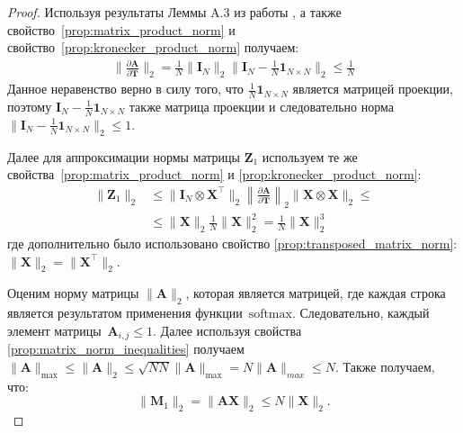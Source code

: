 \begin{proof}

Используя результаты Леммы A.3 из работы \cite{noci2022signalpropagationtransformerstheoretical}, а также свойство~\ref{prop:matrix_product_norm} и свойство~\ref{prop:kronecker_product_norm} получаем:
\begin{align}
    \| \frac{\partial\mathbf{A}}{\partial\mathbf{T}}\|_2 = \frac{1}{N} \| \mathbf{I}_{N}\|_2 \| \mathbf{I}_{N} - \frac{1}{N}\mathbf{1}_{N \times N}\|_2 \leq \frac{1}{N}
\end{align}
Данное неравенство верно в силу того, что $\frac{1}{N}\mathbf{1}_{N \times N}$ является матрицей проекции, поэтому $\mathbf{I}_{N} - \frac{1}{N}\mathbf{1}_{N \times N}$ также матрица проекции и следовательно норма $\| \mathbf{I}_{N} - \frac{1}{N}\mathbf{1}_{N \times N}\|_2 \leq 1$.

Далее для аппроксимации нормы матрицы $\mathbf{Z}_1$ используем те же свойства~\ref{prop:matrix_product_norm} и \ref{prop:kronecker_product_norm}:
\begin{align}\label{chapter-2:theorem:proof_Znorm}
    \|\mathbf{Z}_1\|_2 &\leq \| \mathbf{I}_{N} \otimes \mathbf{X}^{\top}\|_2 \left\| \frac{\partial \mathbf{A}}{\partial \mathbf{T}}\right\|_2 \| \mathbf{X} \otimes \mathbf{X}\|_2 \leq\\
    & \leq \| \mathbf{X}\|_2 \frac{1}{N} \|\mathbf{X}\|^2_2 = \frac{1}{N} \|\mathbf{X}\|^3_2
\end{align}
где дополнительно было использовано свойство \ref{prop:transposed_matrix_norm}: $\| \mathbf{X}\|_2 = \| \mathbf{X}^\top\|_2$.

Оценим норму матрицы $\| \mathbf{A}\|_2$, которая является матрицей, где каждая строка является результатом применения функции~$\text{softmax}$. Следовательно, каждый элемент матрицы~$\mathbf{A}_{i,j} \leq 1$.
Далее используя свойства \ref{prop:matrix_norm_inequalities} получаем $ \|\mathbf{A}\|_{\max} \leq \|\mathbf{A}\|_2 \leq \sqrt{NN} \|\mathbf{A}\|_{\max} = N\| \mathbf{A}\|_{max} \leq N$.
Также получаем, что:
\[
    \|\mathbf{M}_1\|_2 = \|\mathbf{A}\mathbf{X}\|_2 \leq N \|\mathbf{X}\|_2.
\]


\end{proof}
